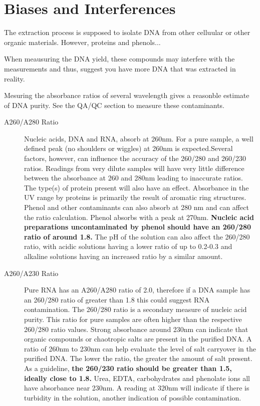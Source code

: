 \documentclass[12pt]{../SOP4_alpha}\usepackage[]{graphicx}\usepackage[]{xcolor}
\begin{document}
\section{Biases and Interferences}

\NP The extraction process is supposed to isolate DNA from other celluular or other organic materials. However, proteins and phenols...  

\NP When meausuring the DNA yield, these compounds may interfere with the measurements and thus, suggest you have more DNA that was extracted in reality. 

\NP Mesuring the absorbance ratios of several wavelength gives a reasonble estimate of DNA purity. See the QA/QC section to measure these contaminants.

\begin{description}
  \item[A260/A280 Ratio] Nucleic acids, DNA and RNA, absorb at 260nm. For a pure sample, a well defined peak (no shoulders or wiggles) at 260nm is expected.Several factors, however, can influence the accuracy of the 260/280 and 260/230 ratios. Readings from very dilute samples will have very little difference between the absorbance at 260 and 280nm leading to inaccurate ratios.  The type(s) of protein present will also have an effect.  Absorbance in the UV range by proteins is primarily the result of aromatic ring structures. Phenol and other contaminants can also absorb at 280 nm and can affect the ratio calculation. Phenol absorbs with a peak at 270nm. \textbf{Nucleic acid preparations uncontaminated by phenol should have an 260/280 ratio of around 1.8. } The pH of the solution can also affect the 260/280 ratio, with acidic solutions having a lower ratio of up to 0.2-0.3 and alkaline solutions having an increased ratio by a similar amount.
  \item[A260/A230 Ratio] Pure RNA has an A260/A280 ratio of 2.0, therefore if a DNA sample has an 260/280 ratio of greater than 1.8 this could suggest RNA contamination. The 260/280 ratio is a secondary measure of nucleic acid purity. This ratio for pure samples are often higher than the respective 260/280 ratio values. Strong absorbance around 230nm can indicate that organic compounds or chaotropic salts are present in the purified DNA.  A ratio of 260nm to 230nm can help evaluate the level of salt carryover in the purified DNA. The lower the ratio, the greater the amount of salt present. As a guideline, \textbf{the 260/230 ratio should be greater than 1.5, ideally close to 1.8.} Urea, EDTA, carbohydrates and phenolate ions all have absorbance near 230nm. A reading at 320nm will indicate if there is turbidity in the solution, another indication of possible contamination.  

\end{description}
\end{document}
